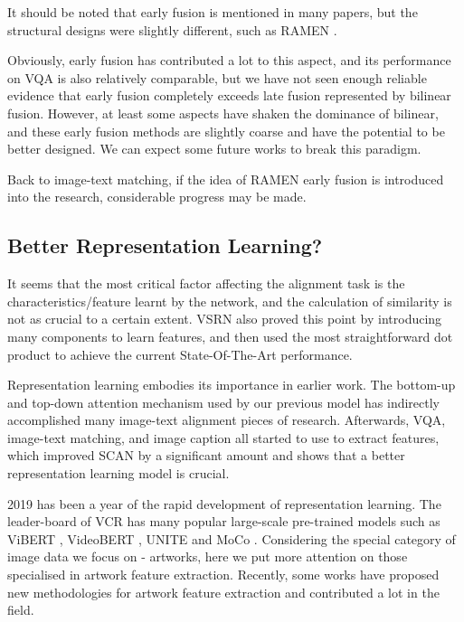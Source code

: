 It should be noted that early fusion is mentioned in many papers, but the structural designs were slightly different, such as RAMEN \cite{ramen}.

Obviously, early fusion has contributed a lot to this aspect, and its performance on VQA is also relatively comparable, but we have not seen enough reliable evidence that early fusion completely exceeds late fusion represented by bilinear fusion. However, at least some aspects have shaken the dominance of bilinear, and these early fusion methods are slightly coarse and have the potential to be better designed. We can expect some future works to break this paradigm.

Back to image-text matching, if the idea of RAMEN \cite{ramen} early fusion is introduced into the research, considerable progress may be made.

\subsection{Better Representation Learning?}

It seems that the most critical factor affecting the alignment task is the characteristics/feature learnt by the network, and the calculation of similarity is not as crucial to a certain extent. VSRN \cite{VSRN} also proved this point by introducing many components to learn features, and then used the most straightforward dot product to achieve the current State-Of-The-Art performance.

Representation learning embodies its importance in earlier work. The bottom-up and top-down \cite{bottomup} attention mechanism used by our previous model has indirectly accomplished many image-text alignment pieces of research. Afterwards, VQA, image-text matching, and image caption all started to use \cite{bottomup} to extract features, which improved SCAN \cite{scan} by a significant amount and shows that a better representation learning model is crucial.

2019 has been a year of the rapid development of representation learning. The leader-board of VCR \cite{zellers2019vcr} has many popular large-scale pre-trained models such as ViBERT \cite{lu2019vilbert}, VideoBERT \cite{sun2019videobert}, UNITE \cite{chen2019uniter} and MoCo \cite{he2019momentum}. Considering the special category of image data we focus on - artworks, here we put more attention on those specialised in artwork feature extraction. Recently, some works \cite{TranslatingArtworks,parttowhole,Art2Real,tan2017artgan,shen2019discovering} have proposed new methodologies for artwork feature extraction and contributed a lot in the field. 


